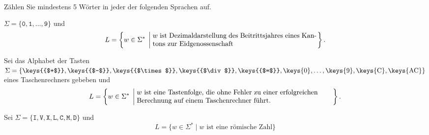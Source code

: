 Zählen Sie mindestens 5 Wörter in jeder der folgenden Sprachen auf.
\begin{teilaufgaben}
\item $\Sigma= \{\texttt{0},\texttt{1},\dots,\texttt{9}\}$ und
\[
L=\left\{ w\in\Sigma^*\;\left|\;
\begin{minipage}{8.4cm}
$w$ ist Dezimaldarstellung des Beitrittsjahres eines Kantons zur
Eidgenossenschaft
\end{minipage}
\right.\right\}.
\]
\item Sei das Alphabet der Tasten 
$\Sigma = \{
\text{\keys{{$+$}}},
\text{\keys{{$-$}}},
\text{\keys{{$\times$}}},
\text{\keys{{$\div$}}},
\text{\keys{{$=$}}},
\text{\keys{0}},
\dots,
\text{\keys{9}},
\text{\keys{C}},
\text{\keys{AC}}
\}
$
eines Taschenrechners gebeben und
\[
L=\left\{
w\in\Sigma^*\;
\left|
\;
\begin{minipage}{10cm}\raggedright
$w$ ist eine Tastenfolge, die ohne Fehler zu einer erfolgreichen Berechnung
auf einem Taschenrechner führt.
\end{minipage}
\right.
\right\}.
\]
\item
Sei $\Sigma = \{
\texttt{I},
\texttt{V},
\texttt{X},
\texttt{L},
\texttt{C},
\texttt{M},
\texttt{D}\}$ und
\[
L=\{
w\in\Sigma^*\;
|
\;
\text{$w$ ist eine römische Zahl}
\}
\]
\end{teilaufgaben}

